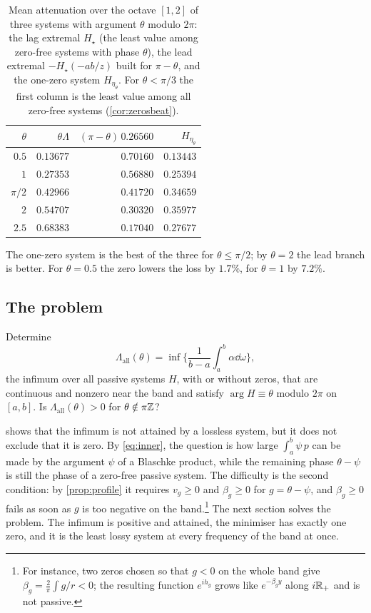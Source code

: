 \begin{table}[t]
\caption{Mean attenuation over the octave $[1,2]$ of three systems with
argument $\theta$ modulo $2\pi$: the lag extremal $H_\star$ (the least value
among zero-free systems with phase $\theta$), the lead extremal
$-H_\star(-ab/z)$ built for $\pi-\theta$, and the one-zero system
$H_{\eta_\theta}$. For $\theta<\pi/3$ the first column is the least value
among all zero-free systems (\cref{cor:zerosbeat}).}
\label{tab:zeros}
\centering
\small
\begin{tabular}{@{}rrrr@{}}
\toprule
$\theta$ & $\theta\Lambda$ & $(\pi-\theta)\,0.26560$ & $H_{\eta_\theta}$ \\
\midrule
$0.5$    & $0.13677$ & $0.70160$ & $0.13443$ \\
$1$      & $0.27353$ & $0.56880$ & $0.25394$ \\
$\pi/2$  & $0.42966$ & $0.41720$ & $0.34659$ \\
$2$      & $0.54707$ & $0.30320$ & $0.35977$ \\
$2.5$    & $0.68383$ & $0.17040$ & $0.27677$ \\
\bottomrule
\end{tabular}
\end{table}

The one-zero system is the best of the three for $\theta\le\pi/2$; by
$\theta=2$ the lead branch is better. For $\theta=0.5$ the zero lowers
the loss by $1.7\%$, for $\theta=1$ by $7.2\%$.

\subsection{The problem}

\begin{problem}\label{prob:zeros}
Determine
\[
\Lambda_{\mathrm{all}}(\theta)=\inf\Big\{\frac1{b-a}\int_a^b\alpha\dd\omega\Big\},
\]
the infimum over all passive systems $H$, with or without zeros, that are
continuous and nonzero near the band and satisfy $\arg H\equiv\theta$ modulo
$2\pi$ on $[a,b]$. Is $\Lambda_{\mathrm{all}}(\theta)>0$ for
$\theta\notin\pi\mathbb Z$?
\end{problem}

 shows that the infimum is not attained by a lossless
system, but it does not exclude that it is zero. By \eqref{eq:inner}, the
question is how large $\int_a^b\psi\,p$ can be made by the argument $\psi$ of
a Blaschke product, while the remaining phase $\theta-\psi$ is still the
phase of a zero-free passive system. The difficulty is the second
condition: by \cref{prop:profile} it requires $v_g\ge0$ and $\beta_g\ge0$ for
$g=\theta-\psi$, and $\beta_g\ge0$ fails as soon as $g$ is too negative on the
band.\footnote{For instance, two zeros chosen so that $g<0$ on the whole band
give $\beta_g=\frac2\pi\int g/r<0$; the resulting function $e^{ih_g}$ grows
like $e^{-\beta_g y}$ along $i\mathbb R_+$ and is not passive.} The next section
solves the problem. The infimum is positive and attained, the minimiser has
exactly one zero, and it is the least lossy system at every frequency of the
band at once.
